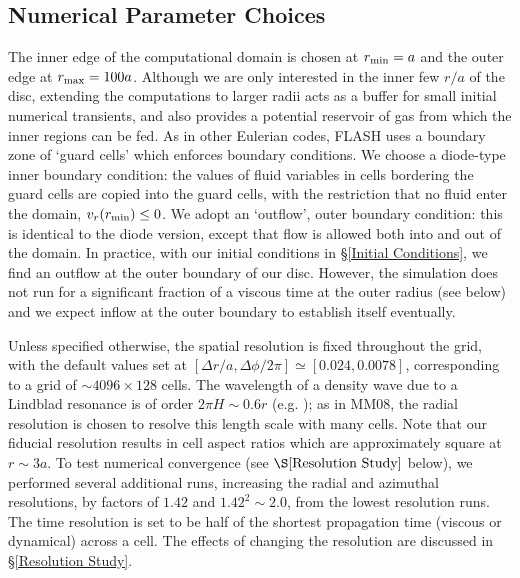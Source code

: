 \subsection{Numerical Parameter Choices}
\label{Numerical Parameter Choices}

The inner edge of the computational domain
is chosen at $r_{\rm min}=a$ and the outer edge at $r_{\rm max}=100a$.
Although we are only interested in the inner few $r/a$ of the disc,
extending the computations to larger radii acts as a buffer for small
initial numerical transients, and also provides a potential reservoir of gas
from which the inner regions can be fed.  As in other Eulerian codes,
FLASH uses a boundary zone of `guard cells' which enforces boundary
conditions. We choose a diode-type inner boundary condition: the values
of fluid variables in cells bordering the guard cells are copied into
the guard cells, with the restriction that no fluid enter the domain,
$v_r(r_{\rm min}) \leq 0$.  We adopt an `outflow', outer boundary
condition: this is identical to the diode version, except that flow is
allowed both into and out of the domain. In practice, with our initial
conditions in \S \ref{Initial Conditions}, we find an outflow
at the outer boundary of our disc. However, the simulation does not
run for a significant fraction of a viscous time at the outer
radius (see below) and we expect inflow at the outer boundary to establish itself eventually.

Unless specified otherwise, the spatial resolution is fixed throughout the grid, with the default
values set at $\left[ \Delta r/a, \Delta \phi/2\pi \right] \simeq
\left[0.024, 0.0078\right]$, corresponding to a grid of $\sim 4096
\times 128$ cells.  The wavelength of a density wave due to a Lindblad
resonance is of order $2 \pi H \sim0.6r$
(e.g. \citealt{DongRafII:2011,DM2012:gaps}); as in MM08, the radial resolution is
chosen to resolve this length scale with many cells. Note that our fiducial resolution 
results in cell aspect ratios which are approximately square at $r \sim 3a$. To test
numerical convergence (see $\S \ref{Resolution Study}$ below), we
performed several additional runs, increasing the radial and azimuthal
resolutions, by factors of $1.42$ and $1.42^2\sim 2.0$, from the lowest resolution runs.
The time resolution is set to be half of the shortest propagation time
(viscous or dynamical) across a cell.  The effects of changing the
resolution are discussed in \S \ref{Resolution Study}.

